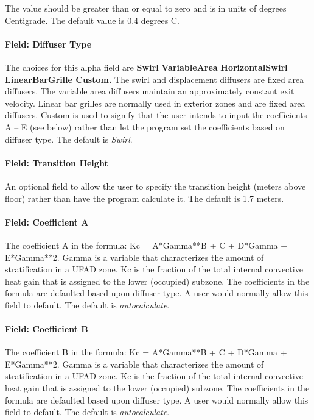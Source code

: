 The value should be greater than or equal to zero and is in units of degrees Centigrade. The default value is 0.4 degrees C.

\paragraph{Field: Diffuser Type}\label{field-diffuser-type}

The choices for this alpha field are \textbf{Swirl} \textbar{} \textbf{VariableArea} \textbar{} \textbf{HorizontalSwirl \textbar{} LinearBarGrille \textbar{} Custom.} The swirl and displacement diffusers are fixed area diffusers. The variable area diffusers maintain an approximately constant exit velocity. Linear bar grilles are normally used in exterior zones and are fixed area diffusers. Custom is used to signify that the user intends to input the coefficients A -- E (see below) rather than let the program set the coefficients based on diffuser type. The default is \emph{Swirl}.

\paragraph{Field: Transition Height}\label{field-transition-height}

An optional field to allow the user to specify the transition height (meters above floor) rather than have the program calculate it. The default is 1.7 meters.

\paragraph{Field: Coefficient A}\label{field-coefficient-a}

The coefficient A in the formula: Kc = A*Gamma**B + C + D*Gamma + E*Gamma**2. Gamma is a variable that characterizes the amount of stratification in a UFAD zone. Kc is the fraction of the total internal convective heat gain that is assigned to the lower (occupied) subzone. The coefficients in the formula are defaulted based upon diffuser type. A user would normally allow this field to default. The default is \emph{autocalculate}.

\paragraph{Field: Coefficient B}\label{field-coefficient-b}

The coefficient B in the formula: Kc = A*Gamma**B + C + D*Gamma + E*Gamma**2. Gamma is a variable that characterizes the amount of stratification in a UFAD zone. Kc is the fraction of the total internal convective heat gain that is assigned to the lower (occupied) subzone. The coefficients in the formula are defaulted based upon diffuser type. A user would normally allow this field to default. The default is \emph{autocalculate}.

